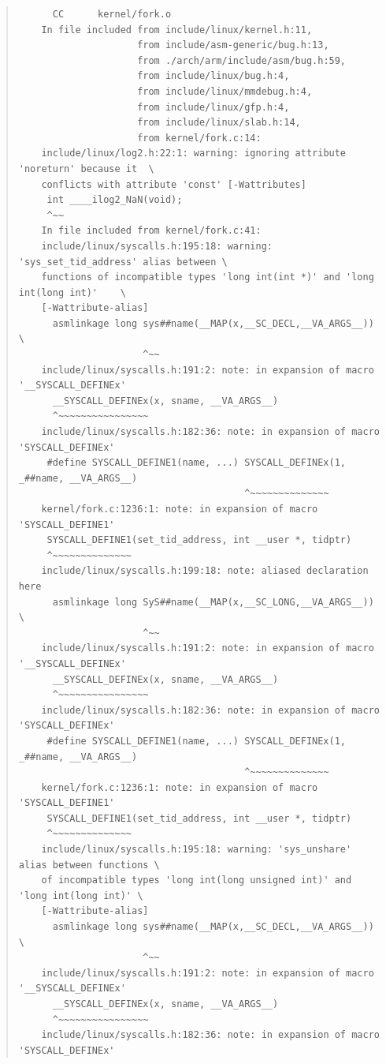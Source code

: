 \documentclass{article}
\begin{document}
\begin{quote}
\begin{verbatim}
	  CC      kernel/fork.o
	In file included from include/linux/kernel.h:11,
	                 from include/asm-generic/bug.h:13,
	                 from ./arch/arm/include/asm/bug.h:59,
	                 from include/linux/bug.h:4,
	                 from include/linux/mmdebug.h:4,
	                 from include/linux/gfp.h:4,
	                 from include/linux/slab.h:14,
	                 from kernel/fork.c:14:
	include/linux/log2.h:22:1: warning: ignoring attribute 'noreturn' because it  \
	conflicts with attribute 'const' [-Wattributes]
	 int ____ilog2_NaN(void);
	 ^~~
	In file included from kernel/fork.c:41:
	include/linux/syscalls.h:195:18: warning: 'sys_set_tid_address' alias between \
	functions of incompatible types 'long int(int *)' and 'long int(long int)'    \
	[-Wattribute-alias]
	  asmlinkage long sys##name(__MAP(x,__SC_DECL,__VA_ARGS__)) \
	                  ^~~
	include/linux/syscalls.h:191:2: note: in expansion of macro '__SYSCALL_DEFINEx'
	  __SYSCALL_DEFINEx(x, sname, __VA_ARGS__)
	  ^~~~~~~~~~~~~~~~~
	include/linux/syscalls.h:182:36: note: in expansion of macro 'SYSCALL_DEFINEx'
	 #define SYSCALL_DEFINE1(name, ...) SYSCALL_DEFINEx(1, _##name, __VA_ARGS__)
	                                    ^~~~~~~~~~~~~~~
	kernel/fork.c:1236:1: note: in expansion of macro 'SYSCALL_DEFINE1'
	 SYSCALL_DEFINE1(set_tid_address, int __user *, tidptr)
	 ^~~~~~~~~~~~~~~
	include/linux/syscalls.h:199:18: note: aliased declaration here
	  asmlinkage long SyS##name(__MAP(x,__SC_LONG,__VA_ARGS__)) \
	                  ^~~
	include/linux/syscalls.h:191:2: note: in expansion of macro '__SYSCALL_DEFINEx'
	  __SYSCALL_DEFINEx(x, sname, __VA_ARGS__)
	  ^~~~~~~~~~~~~~~~~
	include/linux/syscalls.h:182:36: note: in expansion of macro 'SYSCALL_DEFINEx'
	 #define SYSCALL_DEFINE1(name, ...) SYSCALL_DEFINEx(1, _##name, __VA_ARGS__)
	                                    ^~~~~~~~~~~~~~~
	kernel/fork.c:1236:1: note: in expansion of macro 'SYSCALL_DEFINE1'
	 SYSCALL_DEFINE1(set_tid_address, int __user *, tidptr)
	 ^~~~~~~~~~~~~~~
	include/linux/syscalls.h:195:18: warning: 'sys_unshare' alias between functions \
	of incompatible types 'long int(long unsigned int)' and 'long int(long int)' \
	[-Wattribute-alias]
	  asmlinkage long sys##name(__MAP(x,__SC_DECL,__VA_ARGS__)) \
	                  ^~~
	include/linux/syscalls.h:191:2: note: in expansion of macro '__SYSCALL_DEFINEx'
	  __SYSCALL_DEFINEx(x, sname, __VA_ARGS__)
	  ^~~~~~~~~~~~~~~~~
	include/linux/syscalls.h:182:36: note: in expansion of macro 'SYSCALL_DEFINEx'

\end{verbatim}
\end{quote}
\end{document}
